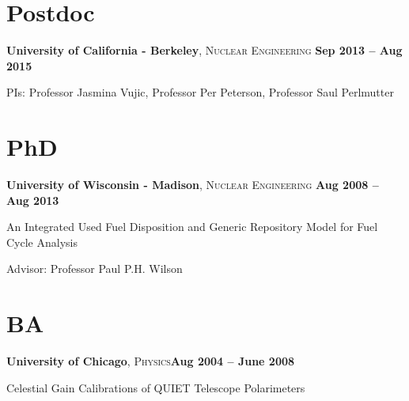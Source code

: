 \documentclass[margin,line]{resume}
\begin{document}
\begin{resume}
    \section{\mysidestyle Postdoc}
    \textbf{University of California - Berkeley}, \textsc{Nuclear Engineering}\hfill \textbf{ Sep 2013 -- Aug 2015}\vspace{-3mm}\\\vspace{-1mm}%
    \begin{list2}
        \item PIs:  Professor Jasmina Vujic, Professor Per Peterson, Professor Saul Perlmutter
    \end{list2}
    \section{\mysidestyle PhD} 
    \textbf{University of Wisconsin - Madison}, \textsc{Nuclear Engineering}\hfill \textbf{ Aug 2008 -- Aug 2013}\vspace{-3mm}\\\vspace{-1mm}%
    \begin{list2}
        \item An Integrated Used Fuel Disposition and Generic Repository Model for Fuel Cycle Analysis
        \item Advisor:  Professor Paul P.H. Wilson                
    \end{list2}\vspace{-1.5mm}
    \section{\mysidestyle BA} 
    \textbf{University of Chicago}, \textsc{Physics}\hfill\textbf{Aug 2004 -- June 2008}\vspace{-3mm}\\\vspace{-1mm}%
    \begin{list2}
	\item Celestial Gain Calibrations of QUIET Telescope Polarimeters
    \end{list2}\vspace{-1.5mm}


\end{resume}
\end{document}
